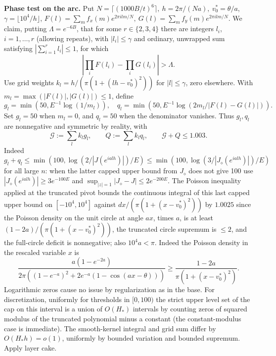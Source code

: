 \documentclass[11pt]{article}
\begin{document}
\textbf{Phase test on the arc.} Put \(N=\lceil (1000B/t)^6\rceil,\ h=2\pi/(Na),\ v_0^*=\theta/a\), \(\gamma=\lfloor 10^4/h\rfloor\), \(F(l)=\sum_m f_x(m)e^{2\pi i lm/N},\ G(l)=\sum_m f_y(m)e^{2\pi i lm/N}\). We claim, putting \(\Lambda=e^{-6B}\), that for some \(r\in\{2,3,4\}\) there are integers \(l_i\), \(i=1,\ldots,r\) (allowing repeats), with \(|l_i|\le\gamma\) and ordinary, unwrapped sum satisfying \(|\sum_{i=1}^r l_i|\le1\), for which
\[
 \left|\prod_i F(l_i)-\prod_i G(l_i)\right|>\Lambda.
\]
Use grid weights \(k_l=h/(\pi(1+(lh-v_0^*)^2))\) for \(|l|\le\gamma\), zero elsewhere. With \(m_l=\max(|F(l)|,|G(l)|)\le1\), define
\[
 g_l=\min(50,E^{-1}\log(1/m_l)),\quad q_l=\min(50,E^{-1}\log(2 m_l/|F(l)-G(l)|)).
\]
Set \(g_l=50\) when \(m_l=0\), and \(q_l=50\) when the denominator vanishes. Thus \(g_l,q_l\) are nonnegative and symmetric by reality, with
\[
 \mathcal G:=\sum_l k_l g_l,\qquad Q:=\sum_l k_l q_l,\qquad \mathcal G+Q\le1.003.
\]
Indeed \(g_l+q_l\le\min(100,\log(2/|J(e^{ialh})|)/E)\le\min(100,\log(3/|J_\diamond(e^{ialh})|)/E)\) for all large \(n\): when the latter capped upper bound from \(J_\diamond\) does not give 100 use \(|J_\diamond(e^{ialh})|\ge 3 e^{-100E}\) and \(\sup_{|z|=1}|J_\diamond-J|\le 2e^{-200E}\). The Poisson inequality applied at the truncated pivot bounds the continuous integral of this last capped upper bound on \([-10^4,10^4]\) against \(dx/(\pi(1+(x-v_0^*)^2))\) by \(1.0025\) since the Poisson density on the unit circle at angle \(ax\), times \(a\), is at least \((1-2a)/(\pi(1+(x-v_0^*)^2))\), the truncated circle supremum is \(\le2\), and the full-circle deficit is nonnegative; also \(10^4 a<\pi\). Indeed the Poisson density in the rescaled variable \(x\) is
\[
 \frac{a(1-e^{-2a})}
 {2\pi((1-e^{-a})^2+2e^{-a}(1-\cos(a x-\theta)))}
 \ge \frac{1-2a}{\pi(1+(x-v_0^*)^2)}.
\]
Logarithmic zeros cause no issue by regularization as in the base. For discretization, uniformly for thresholds in \([0,100)\) the strict upper level set of the cap on this interval is a union of \(O(H_*)\) intervals by counting zeros of squared modulus of the truncated polynomial minus a constant (the constant-modulus case is immediate). The smooth-kernel integral and grid sum differ by \(O(H_* h)=o(1)\), uniformly by bounded variation and bounded supremum. Apply layer cake.
\end{document}
